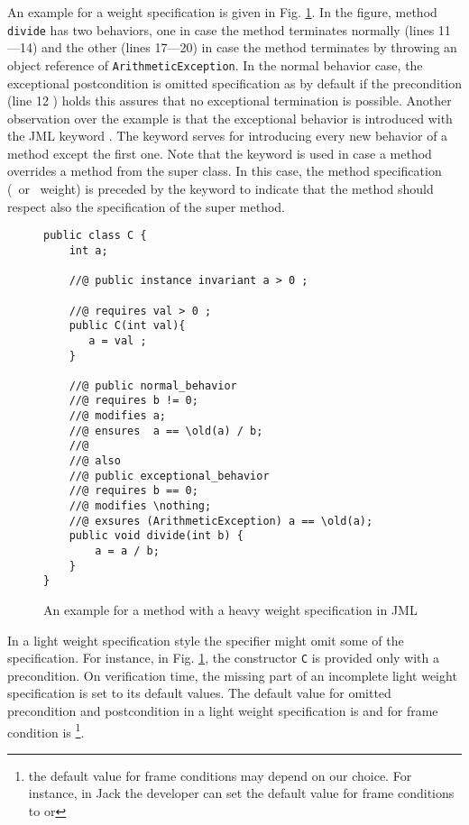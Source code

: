 An example for a \heavy{} weight specification is given in Fig. \ref{bml:heavySp}. In the figure, method \texttt{divide} has 
two behaviors, one in case the method terminates normally (lines 11---14) and the other (lines 17---20) in case the method
 terminates by throwing an object reference of \texttt{ArithmeticException}.
 In the normal behavior case, the exceptional postcondition is omitted  specification as by default if the precondition (line 12 )
 holds this assures that no exceptional
 termination is possible. Another observation over the example is that the exceptional behavior is introduced with the JML keyword . 
 The keyword   serves for introducing every new behavior of a method except the first one. Note that the keyword  
 is used in case a  method overrides a method from the super class. In this case, the method specification (\heavy \ or \light \ weight) is preceded by the keyword  
 to indicate that the method should respect also the specification of the super method.

\begin{figure}
\begin{lstlisting}[frame=trbl]
public class C {
    int a;
    
    //@ public instance invariant a > 0 ;
    
    //@ requires val > 0 ;
    public C(int val){
       a = val ;
    }
   
    //@ public normal_behavior
    //@ requires b != 0;
    //@ modifies a;
    //@ ensures  a == \old(a) / b;  
    //@
    //@ also 
    //@ public exceptional_behavior
    //@ requires b == 0;
    //@ modifies \nothing;
    //@ exsures (ArithmeticException) a == \old(a);
    public void divide(int b) {
        a = a / b;
    }
}
\end{lstlisting}
\caption{\sc An example for a method with a heavy weight specification in JML} \label{bml:heavySp}
\end{figure}
In a light weight specification style the specifier might omit some of the specification. For instance, in Fig. \ref{bml:heavySp},
the constructor \lstinline!C! is provided only with a precondition. On verification time, the missing part of an
 incomplete light weight specification is set to its default values.  The default value for omitted precondition and postcondition 
in a light weight specification is   and for frame condition is \nothing\footnote{the default value for frame conditions
may depend on our choice. For instance, in Jack the developer can set the default value for frame conditions to \nothing{} or \everything  }.



